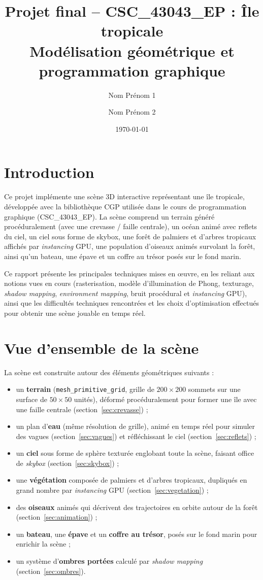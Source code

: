 \documentclass[11pt,a4paper]{article}
\title{Projet final -- CSC\_43043\_EP : Île tropicale\\
\large Modélisation géométrique et programmation graphique}
\author{%
Nom Prénom 1 \and Nom Prénom 2}
\date{\today}
\begin{document}
\maketitle

\section{Introduction}

Ce projet implémente une scène 3D interactive représentant une île
tropicale, développée avec la bibliothèque CGP utilisée dans le cours
de programmation graphique (CSC\_43043\_EP). La scène comprend un
terrain généré procéduralement (avec une crevasse / faille centrale),
un océan animé avec reflets du ciel, un ciel sous forme de skybox, une
forêt de palmiers et d'arbres tropicaux affichés par \emph{instancing}
GPU, une population d'oiseaux animés survolant la forêt, ainsi qu'un
bateau, une épave et un coffre au trésor posés sur le fond marin.

Ce rapport présente les principales techniques mises en \oe{}uvre, en
les reliant aux notions vues en cours (rasterisation, modèle
d'illumination de Phong, texturage, \emph{shadow mapping},
\emph{environment mapping}, bruit procédural et \emph{instancing} GPU),
ainsi que les difficultés techniques rencontrées et les choix
d'optimisation effectués pour obtenir une scène jouable en temps réel.

\section{Vue d'ensemble de la scène}

La scène est construite autour des éléments géométriques suivants :

\begin{itemize}
    \item un \textbf{terrain} (\texttt{mesh\_primitive\_grid}, grille de
    $200 \times 200$ sommets sur une surface de $50\times 50$ unités),
    déformé procéduralement pour former une île avec une faille
    centrale (section~\ref{sec:crevasse}) ;
    \item un plan d'\textbf{eau} (même résolution de grille), animé en
    temps réel pour simuler des vagues (section~\ref{sec:vagues}) et
    réfléchissant le ciel (section~\ref{sec:reflets}) ;
    \item un \textbf{ciel} sous forme de sphère texturée englobant toute
    la scène, faisant office de \emph{skybox} (section~\ref{sec:skybox}) ;
    \item une \textbf{végétation} composée de palmiers et d'arbres
    tropicaux, dupliqués en grand nombre par \emph{instancing} GPU
    (section~\ref{sec:vegetation}) ;
    \item des \textbf{oiseaux} animés qui décrivent des trajectoires en
    orbite autour de la forêt (section~\ref{sec:animation}) ;
    \item un \textbf{bateau}, une \textbf{épave} et un \textbf{coffre au
    trésor}, posés sur le fond marin pour enrichir la scène ;
    \item un système d'\textbf{ombres portées} calculé par
    \emph{shadow mapping} (section~\ref{sec:ombres}).
\end{itemize}
\end{document}
